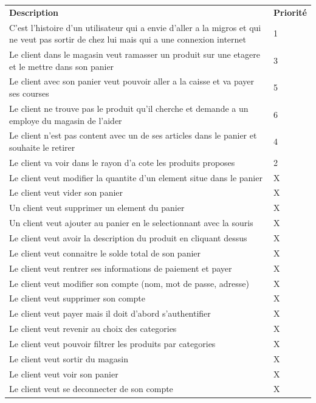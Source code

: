 \documentclass[12pt]{article}
\begin{document}
\center
\begin{tabular}{ | L{13cm} || C{2cm} | }
    \hline
    \textbf{Description} & \textbf{Priorité}\\
    \hhline{|=||=|}
    C'est l'histoire d'un utilisateur qui a envie d'aller a la migros et qui ne veut pas sortir de chez lui mais qui a une connexion internet & 1\\
    \hline
    Le client dans le magasin veut ramasser un produit sur une etagere et le mettre dans son panier & 3\\
    \hline
    Le client avec son panier veut pouvoir aller a la caisse et va payer ses courses & 5\\
    \hline
    Le client ne trouve pas le produit qu'il cherche et demande a un employe du magasin de l'aider & 6\\
    \hline
    Le client n'est pas content avec un de ses articles dans le panier et souhaite le retirer & 4\\
    \hline
    Le client va voir dans le rayon d'a cote les produits proposes & 2\\
    \hline
    Le client veut modifier la quantite d'un element situe dans le panier & X\\
    \hline
    Le client veut vider son panier & X\\
    \hline
    Un client veut supprimer un element du panier & X\\
    \hline
    Un client veut ajouter au panier en le selectionnant avec la souris & X\\
    \hline
    Le client veut avoir la description du produit en cliquant dessus & X\\
    \hline
    Le client veut connaitre le solde total de son panier & X\\
    \hline
    Le client veut rentrer ses informations de paiement et payer & X\\
    \hline
    Le client veut modifier son compte (nom, mot de passe, adresse) & X\\
    \hline
    Le client veut supprimer son compte & X\\
    \hline
    Le client veut payer mais il doit d'abord s'authentifier & X\\
    \hline
    Le client veut revenir au choix des categories & X\\
    \hline
    Le client veut pouvoir filtrer les produits par categories & X\\
    \hline
    Le client veut sortir du magasin & X\\
    \hline
    Le client veut voir son panier & X\\
    \hline
    Le client veut se deconnecter de son compte & X\\
    \hline
\end{tabular}
\end{document}
